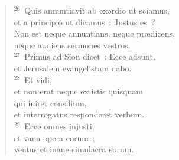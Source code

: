 \begin{verse}
${}^{26}$~Quis annuntiavit ab exordio ut sciamus,\\ et a principio ut dicamus~: Justus es~?\\ Non est neque annuntians, neque pr\ae dicens,\\ neque audiens sermones vestros.\\
${}^{27}$~Primus ad Sion dicet~: Ecce adsunt,\\ et Jerusalem evangelistam dabo.\\
${}^{28}$~Et vidi,\\ et non erat neque ex istis quisquam\\ qui iniret consilium,\\ et interrogatus responderet verbum.\\
${}^{29}$~Ecce omnes injusti,\\ et vana opera eorum~;\\ ventus et inane simulacra eorum.\end{verse}


